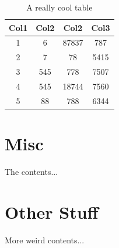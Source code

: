 \documentclass{iyte}    %
\begin{document}
\begin{table}[h!]
	\centering
	\caption{A really cool table}
	\begin{tabular}{||c c c c||} 
		\hline
		Col1 & Col2 & Col2 & Col3 \\ [0.5ex] 
		\hline\hline
		1 & 6 & 87837 & 787 \\ 
		\hline
		2 & 7 & 78 & 5415 \\
		\hline
		3 & 545 & 778 & 7507 \\
		\hline
		4 & 545 & 18744 & 7560 \\
		\hline
		5 & 88 & 788 & 6344 \\ [1ex] 
		\hline
	\end{tabular}
\end{table}


\begin{thesisappendices}
	\chapter{Misc}
	The contents...
	\chapter{Other Stuff}
	More weird contents...
\end{thesisappendices}


%
%
\end{document}
